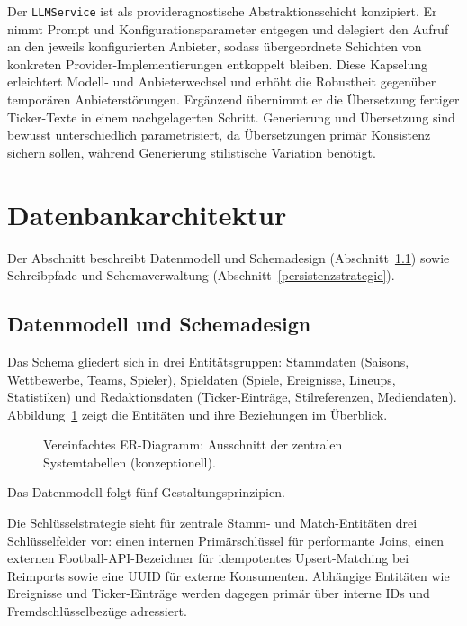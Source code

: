Der \texttt{LLMService} ist als provideragnostische Abstraktionsschicht konzipiert. Er nimmt Prompt und Konfigurationsparameter entgegen und delegiert den Aufruf an den jeweils konfigurierten Anbieter, sodass übergeordnete Schichten von konkreten Provider-Implementierungen entkoppelt bleiben. Diese Kapselung erleichtert Modell- und Anbieterwechsel und erhöht die Robustheit gegenüber temporären Anbieterstörungen. Ergänzend übernimmt er die Übersetzung fertiger Ticker-Texte in einem nachgelagerten Schritt. Generierung und Übersetzung sind bewusst unterschiedlich parametrisiert, da Übersetzungen primär Konsistenz sichern sollen, während Generierung stilistische Variation benötigt.


\section{Datenbankarchitektur}\label{datenbankkonzeption}

Der Abschnitt beschreibt Datenmodell und Schemadesign (Abschnitt~\ref{schemadesign-prinzipien}) sowie Schreibpfade und Schemaverwaltung (Abschnitt~\ref{persistenzstrategie}).
\subsection{Datenmodell und Schemadesign}\label{schemadesign-prinzipien}

Das Schema gliedert sich in drei Entitätsgruppen: Stammdaten (Saisons, Wettbewerbe, Teams, Spieler), Spieldaten (Spiele, Ereignisse, Lineups, Statistiken) und Redaktionsdaten (Ticker-Einträge, Stilreferenzen, Mediendaten). Abbildung~\ref{fig:er-diagramm} zeigt die Entitäten und ihre Beziehungen im Überblick.

\begin{figure}[H]
  \centering
  \DiagramDataModel
  \caption[Vereinfachtes ER-Diagramm der Systemtabellen]{Vereinfachtes ER-Diagramm: Ausschnitt der zentralen Systemtabellen (konzeptionell).}
  \label{fig:er-diagramm}
\end{figure}

Das Datenmodell folgt fünf Gestaltungsprinzipien.

Die Schlüsselstrategie sieht für zentrale Stamm- und Match-Entitäten drei Schlüsselfelder vor: einen internen Primärschlüssel für performante Joins, einen externen Football-API-Bezeichner für idempotentes Upsert-Matching bei Reimports sowie eine UUID für externe Konsumenten. Abhängige Entitäten wie Ereignisse und Ticker-Einträge werden dagegen primär über interne IDs und Fremdschlüsselbezüge adressiert.

